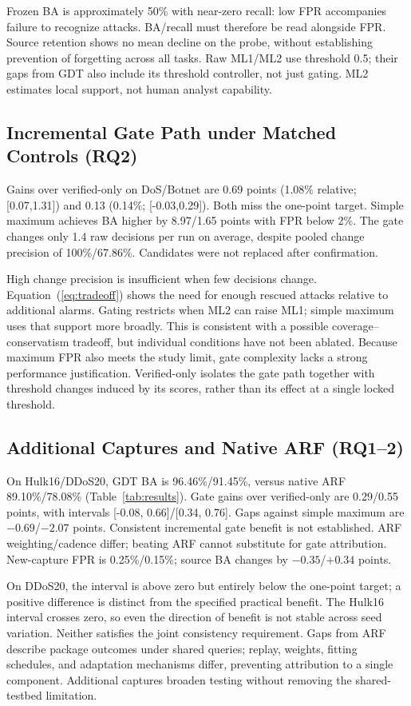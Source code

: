 \documentclass[conference]{IEEEtran}
\begin{document}
Frozen BA is approximately 50\% with near-zero recall: low FPR accompanies failure to recognize attacks. BA/recall must therefore be read alongside FPR. Source retention shows no mean decline on the probe, without establishing prevention of forgetting across all tasks. Raw ML1/ML2 use threshold 0.5; their gaps from GDT also include its threshold controller, not just gating. ML2 estimates local support, not human analyst capability.

\subsection{Incremental Gate Path under Matched Controls (RQ2)}
Gains over verified-only on DoS/Botnet are 0.69 points (1.08\% relative; [0.07,1.31]) and 0.13 (0.14\%; [-0.03,0.29]). Both miss the one-point target. Simple maximum achieves BA higher by 8.97/1.65 points with FPR below 2\%. The gate changes only 1.4 raw decisions per run on average, despite pooled change precision of 100\%/67.86\%. Candidates were not replaced after confirmation.

High change precision is insufficient when few decisions change. Equation~(\ref{eq:tradeoff}) shows the need for enough rescued attacks relative to additional alarms. Gating restricts when ML2 can raise ML1; simple maximum uses that support more broadly. This is consistent with a possible coverage--conservatism tradeoff, but individual conditions have not been ablated. Because maximum FPR also meets the study limit, gate complexity lacks a strong performance justification. Verified-only isolates the gate path together with threshold changes induced by its scores, rather than its effect at a single locked threshold.

\subsection{Additional Captures and Native ARF (RQ1--2)}
On Hulk16/DDoS20, GDT BA is 96.46\%/91.45\%, versus native ARF 89.10\%/78.08\% (Table~\ref{tab:results}). Gate gains over verified-only are 0.29/0.55 points, with intervals [-0.08, 0.66]/[0.34, 0.76]. Gaps against simple maximum are $-0.69$/$-2.07$ points. Consistent incremental gate benefit is not established. ARF weighting/cadence differ; beating ARF cannot substitute for gate attribution. New-capture FPR is 0.25\%/0.15\%; source BA changes by $-0.35$/$+0.34$ points.

On DDoS20, the interval is above zero but entirely below the one-point target; a positive difference is distinct from the specified practical benefit. The Hulk16 interval crosses zero, so even the direction of benefit is not stable across seed variation. Neither satisfies the joint consistency requirement. Gaps from ARF describe package outcomes under shared queries; replay, weights, fitting schedules, and adaptation mechanisms differ, preventing attribution to a single component. Additional captures broaden testing without removing the shared-testbed limitation.
\end{document}
